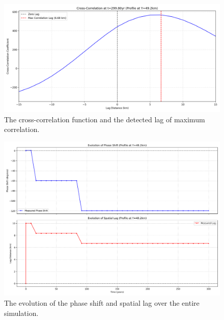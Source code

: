 \begin{figure}[H]
    \includegraphics[scale=0.45]{S1_correlation_t_0037.png}
    \caption{The cross-correlation function and the detected lag of maximum correlation.}
    \label{fig:phase_analysis_Cross_Correlation}
\end{figure}

\begin{figure}[H]
    \includegraphics[scale=0.39]{S1_phase_evolution_summary.png}
    \caption{The evolution of the phase shift and spatial lag over the entire simulation.}
    \label{fig:phase_analysis_Evolution_Plots}
\end{figure}



